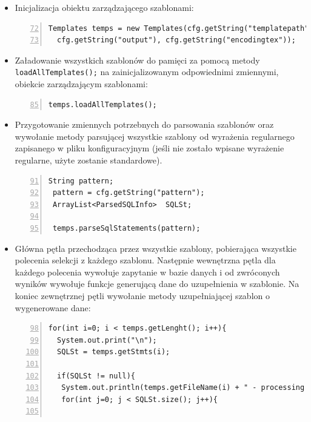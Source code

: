 \begin{itemize}
\vspace{5mm}
\item Inicjalizacja obiektu zarządzającego szablonami:

 \begin{lstlisting}[numbers=left,firstnumber=72]
 Templates temps = new Templates(cfg.getString("templatepath"),
  cfg.getString("output"), cfg.getString("encodingtex"));
\end{lstlisting}

\vspace{5mm}
\item Załadowanie wszystkich szablonów do pamięci za pomocą metody \texttt{loadAllTemplates();} na zainicjalizowanym odpowiednimi zmiennymi, obiekcie zarządzającym szablonami:

 \begin{lstlisting}[numbers=left,firstnumber=85]
 temps.loadAllTemplates();
\end{lstlisting}

\vspace{5mm}
\item Przygotowanie zmiennych potrzebnych do parsowania szablonów oraz wywołanie metody parsującej wszystkie szablony od wyrażenia regularnego zapisanego w pliku konfiguracyjnym (jeśli nie zostało wpisane wyrażenie regularne, użyte zostanie standardowe).

 \begin{lstlisting}[numbers=left,firstnumber=91]
 String pattern;
 pattern = cfg.getString("pattern");
 ArrayList<ParsedSQLInfo>  SQLSt;

 temps.parseSqlStatements(pattern);
\end{lstlisting}

\item Główna pętla przechodząca przez wszystkie szablony, pobierająca wszystkie polecenia selekcji z każdego szablonu. Następnie wewnętrzna pętla dla każdego polecenia wywołuje zapytanie w bazie danych i od zwróconych wyników wywołuje funkcje generującą dane do uzupełnienia w szablonie. Na koniec zewnętrznej pętli wywołanie metody uzupełniającej szablon o wygenerowane dane:

 \begin{lstlisting}[numbers=left,firstnumber=98]
 for(int i=0; i < temps.getLenght(); i++){
  System.out.print("\n");
  SQLSt = temps.getStmts(i);
      
  if(SQLSt != null){
   System.out.println(temps.getFileName(i) + " - processing SQL statements");
   for(int j=0; j < SQLSt.size(); j++){


\end{lstlisting}
\end{itemize}
